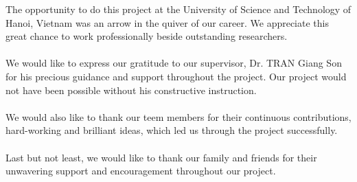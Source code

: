 \noindent The opportunity to do this project at
the University of Science and Technology of Hanoi, Vietnam
was an arrow in the quiver of our career. We appreciate
this great chance to work professionally beside outstanding researchers.\\
\\

We would like to express our gratitude to our 
supervisor, Dr. TRAN Giang Son for his precious 
guidance and support throughout the project. Our
project would not have been possible without his
constructive instruction. \\
\\

We would also like to thank our teem members for 
their continuous contributions, hard-working and brilliant ideas, 
which led us through the project successfully.\\
\\

Last but not least, we would like to thank our family 
and friends for their unwavering support and encouragement
throughout our project.

